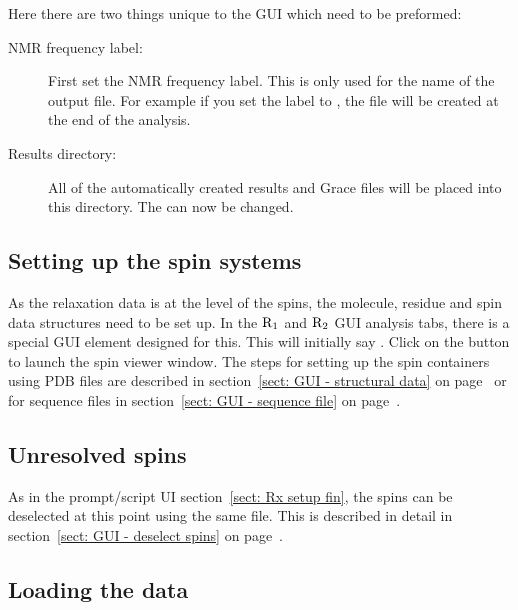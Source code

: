 Here there are two things unique to the GUI which need to be preformed:

\begin{description}
\item[NMR frequency label:]  First set the NMR frequency label.  This is only used for the name of the output file.  For example if you set the label to , the file  will be created at the end of the analysis.
\item[Results directory:]  All of the automatically created results and Grace files will be placed into this directory.  The  can now be changed.
\end{description}



\subsection{Setting up the spin systems}

As the relaxation data is at the level of the spins, the molecule, residue and spin data structures need to be set up.  In the $\mathrm{R}_1$ and $\mathrm{R}_2$ GUI analysis tabs, there is a special  GUI element designed for this.  This will initially say .  Click on the  button to launch the spin viewer window.  The steps for setting up the spin containers using PDB files are described in section~\ref{sect: GUI - structural data} on page~\pageref{sect: GUI - structural data} or for sequence files in section~\ref{sect: GUI - sequence file} on page~\pageref{sect: GUI - sequence file}.



\subsection{Unresolved spins}

As in the prompt/script UI section~\ref{sect: Rx setup fin}, the spins can be deselected at this point using the same  file.  This is described in detail in section~\ref{sect: GUI - deselect spins} on page~\pageref{sect: GUI - deselect spins}.




\subsection{Loading the data}

